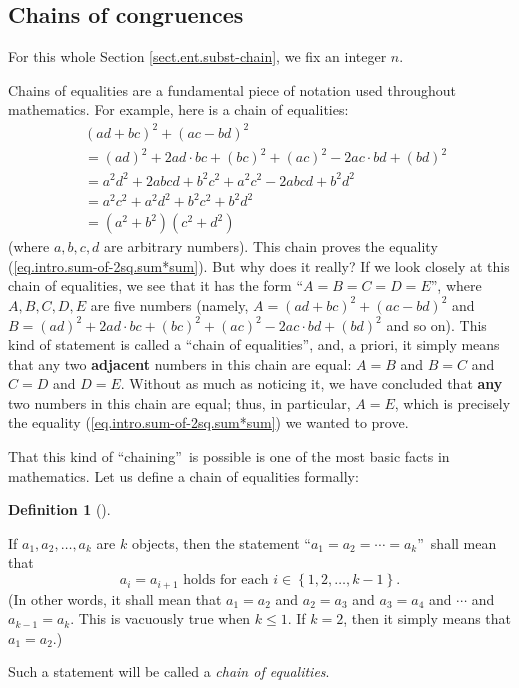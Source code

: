 \documentclass[numbers=enddot,12pt,final,onecolumn,notitlepage]{scrartcl}%
\numberwithin{exer}{subsection}
\theoremstyle{definition}
\newtheorem{defi}[theo]{Definition}
\newenvironment{definition}[1][]
{\begin{defi}[#1]\begin{leftbar}}
{\end{leftbar}\end{defi}}
\begin{document}
\subsection{\label{sect.ent.subst-chain}Chains of congruences}

For this whole Section \ref{sect.ent.subst-chain}, we fix an integer $n$.

Chains of equalities are a fundamental piece of notation used throughout
mathematics. For example, here is a chain of equalities:%
\begin{align*}
&  \left(  ad+bc\right)  ^{2}+\left(  ac-bd\right)  ^{2}\\
&  =\left(  ad\right)  ^{2}+2ad\cdot bc+\left(  bc\right)  ^{2}+\left(
ac\right)  ^{2}-2ac\cdot bd+\left(  bd\right)  ^{2}\\
&  =a^{2}d^{2}+2abcd+b^{2}c^{2}+a^{2}c^{2}-2abcd+b^{2}d^{2}\\
&  =a^{2}c^{2}+a^{2}d^{2}+b^{2}c^{2}+b^{2}d^{2}\\
&  =\left(  a^{2}+b^{2}\right)  \left(  c^{2}+d^{2}\right)
\end{align*}
(where $a,b,c,d$ are arbitrary numbers). This chain proves the equality
(\ref{eq.intro.sum-of-2sq.sum*sum}). But why does it really? If we look
closely at this chain of equalities, we see that it has the form
\textquotedblleft$A=B=C=D=E$\textquotedblright, where $A,B,C,D,E$ are five
numbers (namely, $A=\left(  ad+bc\right)  ^{2}+\left(  ac-bd\right)  ^{2}$ and
$B=\left(  ad\right)  ^{2}+2ad\cdot bc+\left(  bc\right)  ^{2}+\left(
ac\right)  ^{2}-2ac\cdot bd+\left(  bd\right)  ^{2}$ and so on). This kind of
statement is called a \textquotedblleft chain of equalities\textquotedblright,
and, a priori, it simply means that any two \textbf{adjacent} numbers in this
chain are equal: $A=B$ and $B=C$ and $C=D$ and $D=E$. Without as much as
noticing it, we have concluded that \textbf{any} two numbers in this chain are
equal; thus, in particular, $A=E$, which is precisely the equality
(\ref{eq.intro.sum-of-2sq.sum*sum}) we wanted to prove.

That this kind of \textquotedblleft chaining\textquotedblright\ is possible is
one of the most basic facts in mathematics. Let us define a chain of
equalities formally:

\begin{definition}
If $a_{1},a_{2},\ldots,a_{k}$ are $k$ objects\footnotemark, then the statement
\textquotedblleft$a_{1}=a_{2}=\cdots=a_{k}$\textquotedblright\ shall mean
that
\[
a_{i}=a_{i+1}\text{ holds for each }i\in\left\{  1,2,\ldots,k-1\right\}  .
\]
(In other words, it shall mean that $a_{1}=a_{2}$ and $a_{2}=a_{3}$ and
$a_{3}=a_{4}$ and $\cdots$ and $a_{k-1}=a_{k}$. This is vacuously true when
$k\leq1$. If $k=2$, then it simply means that $a_{1}=a_{2}$.)

Such a statement will be called a \textit{chain of equalities}.
\end{definition}
\end{document}
